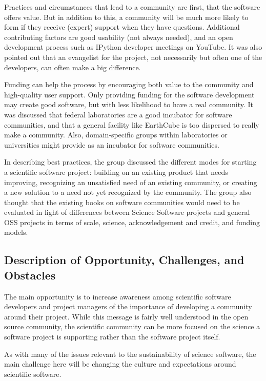 Practices and circumstances that lead to a community are first, that the
software offers value. But in addition to this, a community will be much more
likely to form if they receive (expert) support when they have questions.
Additional contributing factors are good usability (not always needed), and an
open development process such as IPython developer meetings on YouTube. It was
also pointed out that an evangelist for the project, not necessarily but often
one of the developers, can often make a big difference.

Funding can help the process by encouraging both value to the community and
high-quality user support. Only providing funding for the software development
may create good software, but with less likelihood to have a real community. It
was discussed that federal laboratories are a good incubator for software
communities, and that a general facility like EarthCube is too dispersed to
really make a community. Also, domain-specific groups within laboratories or
universities might provide as an incubator for software communities.

In describing best practices, the group discussed the different modes for
starting a scientific software project: building on an existing product that
needs improving, recognizing an unsatisfied need of an existing community, or
creating a new solution to a need not yet recognized by the community. The group
also thought that the existing books on software communities would need to be
evaluated in light of differences between Science Software projects and general
OSS projects in terms of scale, science, acknowledgement and credit, and funding
models.


\subsection{Description of Opportunity, Challenges, and Obstacles}

The main opportunity is to increase awareness among scientific
software developers and project managers of the importance of
developing a community around their project.
While this message is fairly well understood in the open source
community, the scientific community can be more focused on the
science a software project is supporting rather than the software
project itself.

As with many of the issues relevant to the sustainability of science
software, the main challenge here will be changing the culture and
expectations around scientific software.

